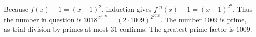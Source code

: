 Because $f(x)-1=(x-1)^2$, induction gives $f^{\circ n}(x)-1=(x-1)^{2^n}$. Thus the number in question is $2018^{2^{2018}}=(2\cdot1009)^{2^{2018}}$. The number $1009$ is prime, as trial division by primes at most $31$ confirms. The greatest prime factor is $\boxed{1009}$.
